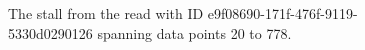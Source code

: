 \begin{figure}
\centering

	\caption[The stall from the read with ID e9f08690-171f-476f-9119-5330d0290126.]{\label{fig:stall}The stall from the read with ID e9f08690-171f-476f-9119-5330d0290126 spanning data points 20 to 778.}
\end{figure}
